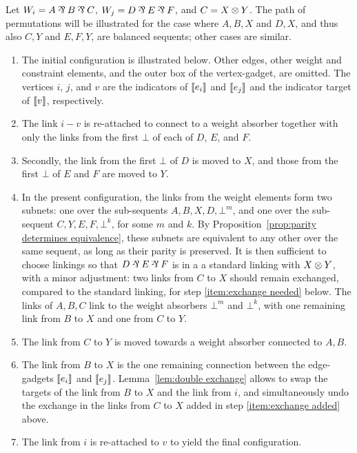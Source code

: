 \documentclass[conference]{IEEEtran}
\begin{document}
\begin{IEEEproof}
Let $W_i=A\parr B\parr C$, $W_j=D\parr E\parr F$, and $C=X\otimes Y$.
%
The path of permutations will be illustrated for the case where $A,B,X$ and $D,X$, and thus also $C,Y$ and $E,F,Y$, are balanced sequents; other cases are similar.
%
\begin{enumerate}
	\item
The initial configuration is illustrated below. 
%
Other edges, other weight and constraint elements, and the outer box of the vertex-gadget, are omitted.
%
The vertices $i$, $j$, and  $v$ are the indicators of $\llbracket e_i\rrbracket$ and $\llbracket e_j\rrbracket$ and the indicator target of $\llbracket v\rrbracket$, respectively.
%


	\item
The link $i-v$ is re-attached to connect to a weight absorber together with only the links from the first $\bot$ of each of $D$, $E$, and $F$. 
%


	\item
Secondly, the link from the first $\bot$ of $D$ is moved to $X$, and those from the first $\bot$ of $E$ and $F$ are moved to $Y$.
%


	\item\label{item:exchange added}
In the present configuration, the links from the weight elements form two subnets: one over the sub-sequents $A,B,X,D,\bot^m$, and one over the sub-sequent $C,Y,E,F,\bot^k$, for some $m$ and $k$.
%
By Proposition~\ref{prop:parity determines equivalence}, these subnets are equivalent to any other over the same sequent, as long as their parity is preserved.
%
It is then sufficient to choose linkings so that $D\parr E\parr F$ is in a a standard linking with $X\otimes Y$, with a minor adjustment: two links from $C$ to $X$ should remain exchanged, compared to the standard linking, for step \ref{item:exchange needed} below.
%
The links of $A,B,C$ link to the weight absorbers $\bot^m$ and $\bot^k$, with one remaining link from $B$ to $X$ and one from $C$ to $Y$.
%
\displayOcto{\octorollC}


	\item
The link from $C$ to $Y$ is moved towards a weight absorber connected to $A,B$.
%


	\item\label{item:exchange needed}
The link from $B$ to $X$ is the one remaining connection between the edge-gadgets $\llbracket e_i\rrbracket$ and $\llbracket e_j\rrbracket$.
%
Lemma~\ref{lem:double exchange} allows to swap the targets of the link from $B$ to $X$ and the link from $i$, and simultaneously undo the exchange in the links from $C$ to $X$ added in step \ref{item:exchange added} above.
%


	\item
The link from $i$ is re-attached to $v$ to yield the final configuration.
%


\end{enumerate}
\end{IEEEproof}
\end{document}

